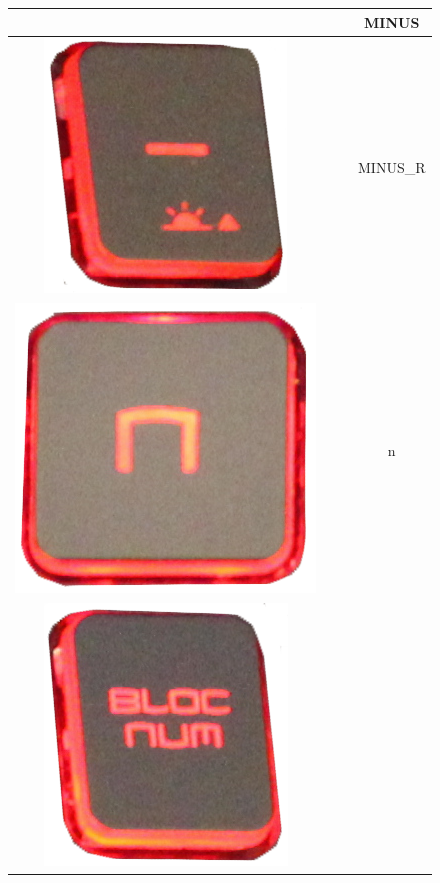 \begin{longtable}{cccc}
\begin{minipage}[c]{.3\textwidth}
\vspace{0.2cm}
\end{minipage} & & & MINUS\\
\hline
\begin{minipage}[c]{.3\textwidth}
\vspace{0.2cm}
\includegraphics[scale=0.1]{Images/KeyMapping/MINUS_R}
\vspace{0.2cm}
\end{minipage} & & & MINUS\_R\\
\hline
\begin{minipage}[c]{.3\textwidth}
\vspace{0.2cm}
\includegraphics[scale=0.1]{Images/KeyMapping/n}
\vspace{0.2cm}
\end{minipage} & & & n\\
\hline
\begin{minipage}[c]{.3\textwidth}
\vspace{0.2cm}
\includegraphics[scale=0.1]{Images/KeyMapping/NUM_LOCK}

\end{minipage}
\end{longtable}
